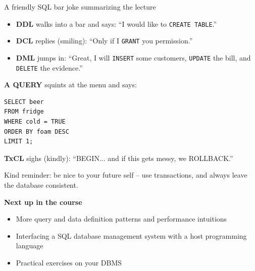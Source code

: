 \documentclass[10pt,aspectratio=169]{beamer}
\begin{document}
\begin{frame}[fragile]{A friendly SQL bar joke summarizing the lecture}
\small

\begin{itemize}
  \item \textbf{DDL} walks into a bar and says: ``I would like to \texttt{CREATE TABLE}.''
  \item \textbf{DCL} replies (smiling): ``Only if I \texttt{GRANT} you permission.''
  \item \textbf{DML} jumps in: ``Great, I will \texttt{INSERT} some customers, \texttt{UPDATE} the bill, and \texttt{DELETE} the evidence.''
\end{itemize}

\vspace{2mm}
\textbf{A QUERY} squints at the menu and says:
\begin{lstlisting}[style=sqlite,basicstyle=\scriptsize\ttfamily]
SELECT beer
FROM fridge
WHERE cold = TRUE
ORDER BY foam DESC
LIMIT 1;
\end{lstlisting}

\vspace{1mm}
\textbf{TxCL} sighs (kindly): ``BEGIN... and if this gets messy, we ROLLBACK.''

\vspace{1mm}
\footnotesize
Kind reminder: be nice to your future self -- use transactions, and always leave the database consistent.

\end{frame}


\begin{frame}[plain]
\vfill
\centering
{\Large \textbf{Next up in the course}}\\[0.8em]
\begin{itemize}
  \item More query and data definition patterns and performance intuitions
  \item Interfacing a SQL database management system with a host programming language
  \item Practical exercises on your DBMS
\end{itemize}
\vfill
\end{frame}
\end{document}
